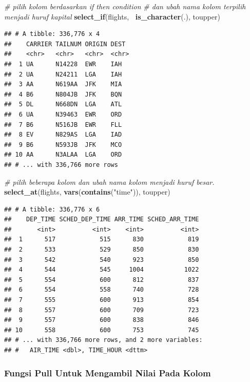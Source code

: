 \documentclass[]{book}
\newenvironment{Shaded}{\begin{snugshade}}{\end{snugshade}}
\newcommand{\KeywordTok}[1]{\textcolor[rgb]{0.13,0.29,0.53}{\textbf{#1}}}
\newcommand{\StringTok}[1]{\textcolor[rgb]{0.31,0.60,0.02}{#1}}
\newcommand{\CommentTok}[1]{\textcolor[rgb]{0.56,0.35,0.01}{\textit{#1}}}
\newcommand{\OperatorTok}[1]{\textcolor[rgb]{0.81,0.36,0.00}{\textbf{#1}}}
\newcommand{\NormalTok}[1]{#1}
\begin{document}
\begin{Shaded}
\begin{Highlighting}[]
\CommentTok{# pilih kolom berdasarkan if then condition}
\CommentTok{# dan ubah nama kolom terpilih menjadi huruf kapital}
\KeywordTok{select_if}\NormalTok{(flights, }\OperatorTok{~}\KeywordTok{is_character}\NormalTok{(.), toupper)}
\end{Highlighting}
\end{Shaded}

\begin{verbatim}
## # A tibble: 336,776 x 4
##    CARRIER TAILNUM ORIGIN DEST 
##    <chr>   <chr>   <chr>  <chr>
##  1 UA      N14228  EWR    IAH  
##  2 UA      N24211  LGA    IAH  
##  3 AA      N619AA  JFK    MIA  
##  4 B6      N804JB  JFK    BQN  
##  5 DL      N668DN  LGA    ATL  
##  6 UA      N39463  EWR    ORD  
##  7 B6      N516JB  EWR    FLL  
##  8 EV      N829AS  LGA    IAD  
##  9 B6      N593JB  JFK    MCO  
## 10 AA      N3ALAA  LGA    ORD  
## # ... with 336,766 more rows
\end{verbatim}

\begin{Shaded}
\begin{Highlighting}[]
\CommentTok{# pilih beberapa kolom dan ubah nama kolom menjadi huruf besar.}
\KeywordTok{select_at}\NormalTok{(flights, }\KeywordTok{vars}\NormalTok{(}\KeywordTok{contains}\NormalTok{(}\StringTok{"time"}\NormalTok{)), toupper)}
\end{Highlighting}
\end{Shaded}

\begin{verbatim}
## # A tibble: 336,776 x 6
##    DEP_TIME SCHED_DEP_TIME ARR_TIME SCHED_ARR_TIME
##       <int>          <int>    <int>          <int>
##  1      517            515      830            819
##  2      533            529      850            830
##  3      542            540      923            850
##  4      544            545     1004           1022
##  5      554            600      812            837
##  6      554            558      740            728
##  7      555            600      913            854
##  8      557            600      709            723
##  9      557            600      838            846
## 10      558            600      753            745
## # ... with 336,766 more rows, and 2 more variables:
## #   AIR_TIME <dbl>, TIME_HOUR <dttm>
\end{verbatim}

\subsubsection{Fungsi Pull Untuk Mengambil Nilai Pada
Kolom}\label{fungsi-pull-untuk-mengambil-nilai-pada-kolom}
\end{document}
